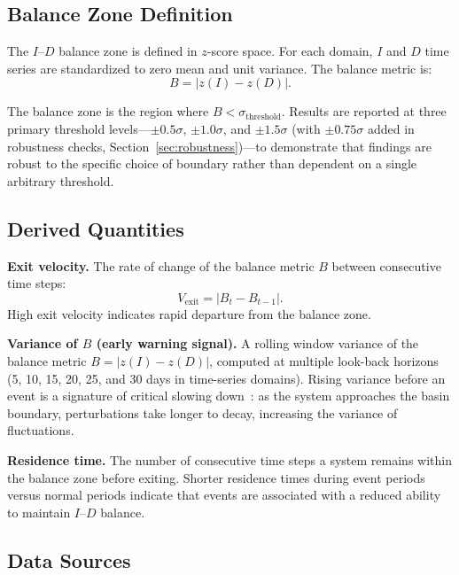 \documentclass[aip,cha,reprint,amsmath,amssymb,final,floatfix]{revtex4-2}
\begin{document}
\subsection{Balance Zone Definition}

The $I$--$D$ balance zone is defined in $z$-score space. For each domain, $I$ and $D$ time series are standardized to zero mean and unit variance. The balance metric is:
\begin{equation}
B = |z(I) - z(D)|.
\end{equation}

The balance zone is the region where $B < \sigma_{\text{threshold}}$. Results are reported at three primary threshold levels---$\pm 0.5\sigma$, $\pm 1.0\sigma$, and $\pm 1.5\sigma$ (with $\pm 0.75\sigma$ added in robustness checks, Section~\ref{sec:robustness})---to demonstrate that findings are robust to the specific choice of boundary rather than dependent on a single arbitrary threshold.

\subsection{Derived Quantities}

\textbf{Exit velocity.} The rate of change of the balance metric $B$ between consecutive time steps:
\begin{equation}
V_{\text{exit}} = |B_t - B_{t-1}|.
\end{equation}
High exit velocity indicates rapid departure from the balance zone.

\textbf{Variance of $B$ (early warning signal).} A rolling window variance of the balance metric $B = |z(I) - z(D)|$, computed at multiple look-back horizons (5, 10, 15, 20, 25, and 30 days in time-series domains). Rising variance before an event is a signature of critical slowing down~\cite{scheffer2009,dakos2012}: as the system approaches the basin boundary, perturbations take longer to decay, increasing the variance of fluctuations.

\textbf{Residence time.} The number of consecutive time steps a system remains within the balance zone before exiting. Shorter residence times during event periods versus normal periods indicate that events are associated with a reduced ability to maintain $I$--$D$ balance.

\subsection{Data Sources}
\end{document}

